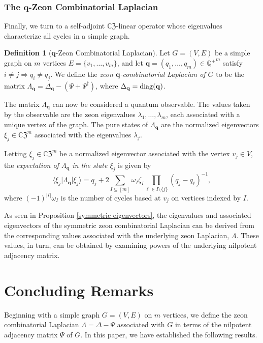\documentclass{article}
\theoremstyle{definition}
\newtheorem{definition}[theorem]{Definition}
\newcommand{\CZ}{\mathbb{C}\mathfrak{Z}}
\newcommand{\q}{\mathbf{q}}
\numberwithin{equation}{section}
\begin{document}
\subsubsection{The $\q$-Zeon Combinatorial Laplacian}

Finally, we turn to a self-adjoint $\CZ$-linear operator whose eigenvalues characterize all cycles in a simple graph.  

\begin{definition}[$\q$-Zeon Combinatorial Laplacian]\label{quantum laplacian def}
Let $G=(V,E)$ be a simple graph on $m$ vertices $E=\{v_1, \ldots, v_m\}$, and let $\q=(q_1, \ldots, q_m)\in{\mathbb{Q}^+}^m$ satisfy $i\ne j\Rightarrow q_i\ne q_j$.  We define the {\em zeon $\q$-combinatorial Laplacian of $G$} to be the matrix $\Lambda_\q=\Delta_\q-(\Psi+\Psi^\dag)$, where $\Delta_\q={\rm diag}(\q)$.  
\end{definition}

The matrix $\Lambda_\q$ can now be considered a quantum observable.  The values taken by the observable are the zeon eigenvalues $\lambda_{1}, \ldots, \lambda_{m}$, each associated with a unique vertex of the graph.   The pure states of $\Lambda_\q$ are the normalized eigenvectors $\xi_j\in\CZ^m$ associated with the eigenvalues $\lambda_{j}$.

Letting $\xi_j\in\CZ^m$ be a normalized eigenvector associated with the vertex $v_j\in V$, the {\em expectation of $\Lambda_\q$ in the state $\xi_j$} is given by 
\begin{equation*}
\langle \xi_j\vert \Lambda_\q \vert \xi_j\rangle= q_j+ 2\sum_{I\subseteq [m]}\omega_I\zeta_{I}\prod_{\ell\in I\setminus\{j\}}(q_j-q_\ell)^{-1},  
\end{equation*}
where $(-1)^{|I|}\omega_I$ is the number of cycles based at $v_j$ on vertices indexed by $I$.

As seen in Proposition \ref{symmetric eigenvectors}, the eigenvalues and associated eigenvectors of the symmetric zeon combinatorial Laplacian can be derived from the corresponding values associated with the underlying zeon Laplacian, $\Lambda$.  These values, in turn, can be obtained by examining powers of the underlying nilpotent adjacency matrix.  


\section{Concluding Remarks}\label{conclusion}

Beginning with a simple graph $G=(V,E)$ on $m$ vertices, we define the zeon combinatorial Laplacian $\Lambda=\Delta-\Psi$ associated with $G$ in terms of the nilpotent adjacency matrix $\Psi$ of $G$.  In this paper, we have established the following results.
\end{document}

